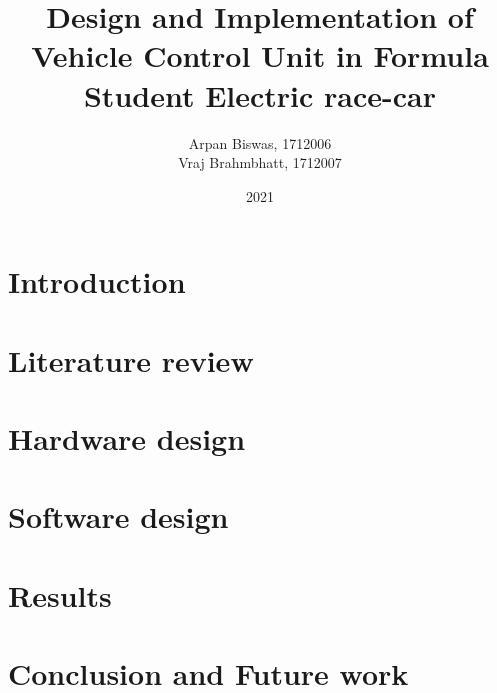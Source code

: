 \documentclass[12pt]{report}
\title{
{Design and Implementation of Vehicle Control Unit in Formula Student Electric race-car}}
\author{Arpan Biswas, 1712006 \\ Vraj Brahmbhatt, 1712007}
\date{2021}
\newcommand\blankpage{%
    \null
    \thispagestyle{empty}%
    \addtocounter{page}{-1}%
    \newpage}
\begin{document}
\renewcommand{\thepage}{\roman{page}}















\setlength{\parskip}{0pt}
\tableofcontents
{}
\listoffigures
{}
\listoftables







\clearpage
\setcounter{page}{1}
\setcounter{chapter}{0}
\renewcommand{\thepage}{\arabic{page}}	

\setlength{\parskip}{1em}

\chapter{Introduction}\label{cha:introduction}


\chapter{Literature review\label{cha:litreivew}}\label{chap:lit}


\chapter{Hardware design\label{cha:hardware}}


\chapter{Software design\label{cha:software}}


\chapter{Results}


\chapter{Conclusion and Future work}


\printbibliography




\end{document}
